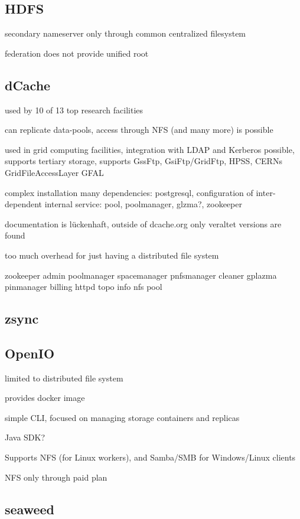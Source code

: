 \subsection{HDFS}

secondary nameserver only through common centralized filesystem

federation does not provide unified root


\subsection{dCache}

used by 10 of 13 top research facilities 
\cite{dcache:main}
\cite{dcache:overview:whitepaper}

can replicate data-pools, access through NFS (and many more) is possible

used in grid computing facilities, integration with LDAP and Kerberos possible, supports tertiary storage, supports GssFtp, GsiFtp/GridFtp, HPSS, CERNs GridFileAccessLayer GFAL

complex installation
many dependencies: postgresql, configuration of inter-dependent internal service: pool, poolmanager, glzma?, zookeeper

documentation is lückenhaft, outside of dcache.org only veraltet versions are found

too much overhead for just having a distributed file system

zookeeper
admin
poolmanager
spacemanager
pnfsmanager
cleaner
gplazma
pinmanager
billing
httpd
topo
info
nfs
pool


\subsection{zsync}
\cite{zsync:main}

\subsection{OpenIO}

limited to distributed file system

provides docker image

simple CLI, focused on managing storage containers and replicas

Java SDK?

Supports NFS (for Linux workers), and Samba/SMB for Windows/Linux clients

NFS only through paid plan

\subsection{seaweed}

